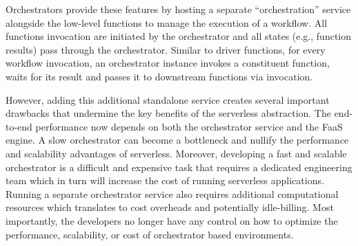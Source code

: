 Orchestrators provide these features by hosting a separate ``orchestration'' service alongside the low-level functions to manage the execution of a workflow. All functions
invocation are initiated by the orchestrator and all states (e.g., function
results) pass through the orchestrator. Similar to driver functions, for every workflow
invocation, an orchestrator instance invokes a constituent function, waits for
its result and passes it to downstream functions via invocation. 

However, adding this additional standalone service
creates several important drawbacks that undermine the key benefits of
the serverless abstraction. 
The end-to-end performance now depends on both the orchestrator service and the FaaS engine. A slow
orchestrator can become a bottleneck and nullify the performance and scalability advantages
of serverless. 
Moreover, developing a fast and scalable orchestrator is a difficult and expensive task
that  requires a dedicated engineering team which in turn will increase the cost of running serverless applications. Running a separate orchestrator service also requires additional computational resources which translates to cost overheads and potentially idle-billing.
Most importantly, the developers no longer have any control on how to optimize the performance, scalability, or cost of orchestrator based environments.   






